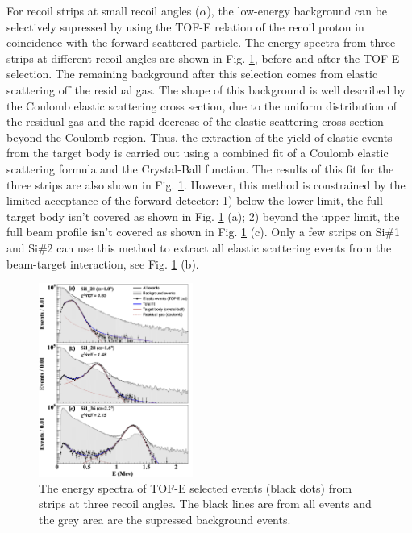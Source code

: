 \documentclass[fleqn,twocolumn,a4paper]{ikpar}
\begin{document}
For recoil strips at small recoil angles ($\alpha$), the low-energy background
can be selectively supressed by using the TOF-E relation of the recoil proton in
coincidence with the forward scattered particle.
The energy spectra from three strips at different recoil angles are shown in
Fig. \ref{fig:coulomb_cb2_fit},  before and after the TOF-E selection.
The remaining background after this selection comes from elastic scattering off the residual gas.
The shape of this background is well described by the Coulomb elastic scattering cross
section, due to the uniform distribution of the residual gas \cite{r2} and the
rapid decrease of the elastic scattering cross section beyond the Coulomb region.
Thus, the extraction of the yield of elastic events from the target body is carried out
using a combined fit of a Coulomb elastic scattering formula and the Crystal-Ball
function.
The results of this fit for the three strips are also shown in Fig. \ref{fig:coulomb_cb2_fit}.
However, this method is constrained by the limited acceptance of the forward detector:
1) below the lower limit, the full target body isn't covered as shown in Fig.
\ref{fig:coulomb_cb2_fit} (a);
2) beyond the upper limit, the full beam profile isn't covered as shown in
Fig. \ref{fig:coulomb_cb2_fit} (c).
Only a few strips on Si\#1 and Si\#2 can use this method to extract all
elastic scattering events from the beam-target interaction, see Fig. \ref{fig:coulomb_cb2_fit} (b).
\begin{figure}[!htb]
	\includegraphics[width=0.45\textwidth]{./coulomb_cb2_fit.png}
  \caption{The energy spectra of TOF-E selected events (black dots) from strips at three
    recoil angles. The black lines are from all events and the grey area are the
  supressed background events. }
  \label{fig:coulomb_cb2_fit}
\end{figure}
\end{document}
